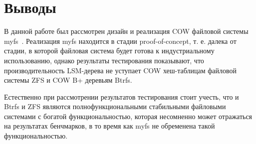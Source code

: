 \section{Выводы}

В данной работе был рассмотрен дизайн и реализация COW файловой системы
myfs~\cite{MYFS}. Реализация myfs находится в стадии proof-of-concept, т. е.
далека от стадии, в которой файловая система будет готова к индустриальному
использованию, однако результаты тестирования показывают, что производительность 
LSM-дерева не уступает COW хеш-таблицам файловой системы ZFS и COW B+ деревьям
Btrfs.

Естественно при рассмотрении результатов тестирования стоит учесть, что и Btrfs
и ZFS являются полнофункциональными стабильными файловыми системами с богатой
функциональностью, которая несомненно может отражаться на результатах бенчмарков,
в то время как myfs не обременена такой функциональностью.
